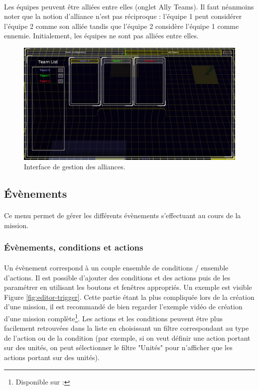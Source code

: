 \documentclass[a4paper]{article}
\begin{document}
\paragraph{ }
Les équipes peuvent être alliées entre elles (onglet Ally Teams). Il faut néanmoins noter que la notion d'alliance n'est pas réciproque : l'équipe 1 peut considérer l'équipe 2 comme son alliée tandis que l'équipe 2 considère l'équipe 1 comme ennemie. Initialement, les équipes ne sont pas alliées entre elles.
\begin{figure}[H]
\centering
\includegraphics[width=\linewidth]{editor-allyteam.png}
\caption{Interface de gestion des alliances.}
\label{fig:editor-allyteam}
\end{figure}
\subsection{Évènements}
\paragraph{ }
Ce menu permet de gérer les différents évènements s'effectuant au cours de la mission.
\subsubsection{Évènements, conditions et actions}
\paragraph{ }
Un évènement correspond à un couple ensemble de conditions / ensemble d'actions. Il est possible d'ajouter des conditions et des actions puis de les paramétrer en utilisant les boutons et fenêtres appropriés. Un exemple est visible Figure \ref{fig:editor-trigger}. Cette partie étant la plus compliquée lors de la création d'une mission, il est recommandé de bien regarder l'exemple vidéo de création d'une mission complète\footnote{Disponible sur : }. Les actions et les conditions peuvent être plus facilement retrouvées dans la liste en choisissant un filtre correspondant au type de l'action ou de la condition (par exemple, si on veut définir une action portant sur des unités, on peut sélectionner le filtre "Unités" pour n'afficher que les actions portant sur des unités).
\end{document}
